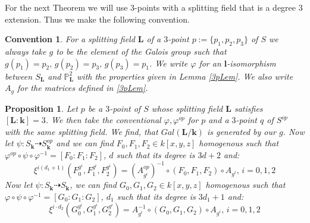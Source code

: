 \documentclass[12pt, oneside, reqno]{amsart}
\newtheorem{convention}[theorem]{Convention}
\newtheorem{proposition}[theorem]{Proposition}
\begin{document}
\noindent
For the next Theorem we will use $3$-points with a splitting field that is a degree $3$ extension. Thus we make the following convention.
\begin{convention}
    For a splitting field $\textbf{L}$ of a $3$-point $p := \{ p_1, p_2, p_3\}$ of $S$ we always take $g$ to be the element of the Galois group such that $g(p_1) = p_2, \, g(p_2) = p_3, \, g(p_3) = p_1$. We write $\varphi$ for an $\textbf{l}$-isomorphism between $S_{\textbf{L}}$ and $\mathbb{P}^2_\textbf{L}$ with the properties given in Lemma \ref{3pLem}. We also write $A_g$ for the matrices defined in \ref{3pLem}. 
\end{convention}

\begin{proposition} \label{AffineRep}
    Let $p$ be a $3$-point of $S$ whose splitting field $\textbf{L}$ satisfies $[\textbf{L}:\textbf{k}]=3$. We then take the conventional $\varphi, \varphi^{op}$ for $p$ and a $3$-point $q$ of $S^{op}$ with the same splitting field. We find, that $Gal({\textbf{L}/\textbf{k}})$ is generated by our $g$. Now let $\psi: S_{\textbf{k}} \dashrightarrow S^{op}_{\textbf{k}}$ and we can find $F_0,F_1,F_2 \in k[x,y,z]$ homogenous such that $\varphi^{op} \circ \psi \circ \varphi^{-1} = [F_0:F_1:F_2]$, $d$ such that its degree is $3d + 2$ and:
    \begin{equation} \label{eq:RepB}\xi^{i(d_1+1)} (F_0^{g^i}, F_1^{g^i}, F_2^{g^i}) = (A_{g^i}^{op})^{-1} \circ (F_0,F_1,F_2) \circ A_{g^i}, \, i=0,1,2 \end{equation}
    Now let $\psi: S_{\textbf{k}} \dashrightarrow S_{\textbf{k}}$, we can find $G_0,G_1,G_2 \in k[x,y,z]$ homogenous such that $\varphi \circ \psi \circ \varphi^{-1} = [G_0:G_1:G_2]$, $d_1$ such that its degree is $3d_1 + 1$ and:
    \begin{equation}\label{eq:RepB2} \xi^{i\cdot d_2} (G_0^{g^i}, G_1^{g^i}, G_2^{g^i}) = A_{g^i}^{-1} \circ (G_0,G_1,G_2) \circ A_{g^i}, \, i=0,1,2 \end{equation}
\end{proposition}
\end{document}
